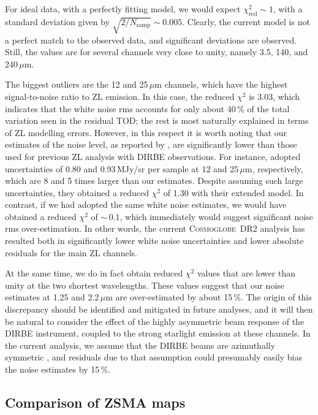 \documentclass[twocolumn]{aa}
\newcommand{\cosmoglobe}{\textsc{Cosmoglobe}}
\begin{document}
For ideal data, with a perfectly fitting model, we would
expect $\chi^2_{\mathrm{red}}\sim 1$, with a standard deviation given
by $\sqrt{2/N_{\mathrm{samp}}}\sim0.005$. Clearly, the current model
is not a perfect match to the observed data, and significant
deviations are observed. Still, the values are for several channels
very close to unity, namely 3.5, 140, and 240$\,\mu$m.

The biggest outliers are  the 12 and 25$\,\mu$m channels, which
have the highest signal-to-noise ratio to ZL emission. In this case,
the reduced $\chi^2$ is 3.03, which indicates that the white noise rms
accounts for only about 40\,\% of the total variation seen in the residual
TOD; the rest is most naturally explained in terms of ZL modelling
errors. However, in this respect it is worth noting that our estimates
of the noise level, as reported by \citet{CG02_01}, are
significantly lower than those used for previous ZL analysis with
DIRBE observations. For instance, \citet{Robinson2013} adopted
uncertainties of 0.80 and 0.93\,MJy/sr per sample at 12 and
25$\,\mu$m, respectively, which are 8 and 5 times larger than our
estimates. Despite assuming such large uncertainties, they obtained a
reduced $\chi^2$ of 1.30 with their extended model. In contrast, if we
had adopted the same white noise estimates, we would have obtained a
reduced $\chi^2$ of $\sim$\,$0.1$, which immediately would suggest
significant noise rms over-estimation. In other words, the current
\cosmoglobe\ DR2 analysis has resulted both in significantly lower
white noise uncertainties and lower absolute residuals for the main ZL
channels.

At the same time, we do in fact obtain reduced $\chi^2$ values that are
lower than unity at the two shortest wavelengths. These values
suggest that our noise estimates at 1.25 and 2.2$\,\mu$m are
over-estimated by about 15\,\%. The origin of this discrepancy should
be identified and mitigated in future analyses, and it will then be
natural to consider the effect of the highly asymmetric beam response
of the DIRBE instrument, coupled to the strong starlight emission at
these channels. In the current analysis, we assume that the DIRBE
beams are azimuthally symmetric \citep{CG02_01}, and residuals due to
that assumption could presumably easily bias the noise estimates by
15\,\%. 


\subsection{Comparison of ZSMA maps}
\end{document}
